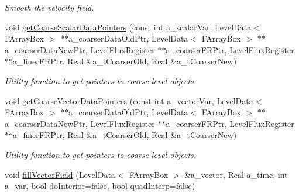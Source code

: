 \begin{DoxyCompactItemize}
\begin{DoxyCompactList}\small\item\em Smooth the velocity field. \end{DoxyCompactList}\item 
\hypertarget{class_a_m_r_level_mushy_layer_a0e1a5d490de9799a0579aa3bcc35a021}{void \hyperlink{class_a_m_r_level_mushy_layer_a0e1a5d490de9799a0579aa3bcc35a021}{get\-Coarse\-Scalar\-Data\-Pointers} (const int a\-\_\-scalar\-Var, Level\-Data$<$ F\-Array\-Box $>$ $\ast$$\ast$a\-\_\-coarser\-Data\-Old\-Ptr, Level\-Data$<$ F\-Array\-Box $>$ $\ast$$\ast$a\-\_\-coarser\-Data\-New\-Ptr, Level\-Flux\-Register $\ast$$\ast$a\-\_\-coarser\-F\-R\-Ptr, Level\-Flux\-Register $\ast$$\ast$a\-\_\-finer\-F\-R\-Ptr, Real \&a\-\_\-t\-Coarser\-Old, Real \&a\-\_\-t\-Coarser\-New)}\label{class_a_m_r_level_mushy_layer_a0e1a5d490de9799a0579aa3bcc35a021}

\begin{DoxyCompactList}\small\item\em Utility function to get pointers to coarse level objects. \end{DoxyCompactList}\item 
\hypertarget{class_a_m_r_level_mushy_layer_abc19ce85374efbff3c5c05d8bd71b330}{void \hyperlink{class_a_m_r_level_mushy_layer_abc19ce85374efbff3c5c05d8bd71b330}{get\-Coarse\-Vector\-Data\-Pointers} (const int a\-\_\-vector\-Var, Level\-Data$<$ F\-Array\-Box $>$ $\ast$$\ast$a\-\_\-coarser\-Data\-Old\-Ptr, Level\-Data$<$ F\-Array\-Box $>$ $\ast$$\ast$a\-\_\-coarser\-Data\-New\-Ptr, Level\-Flux\-Register $\ast$$\ast$a\-\_\-coarser\-F\-R\-Ptr, Level\-Flux\-Register $\ast$$\ast$a\-\_\-finer\-F\-R\-Ptr, Real \&a\-\_\-t\-Coarser\-Old, Real \&a\-\_\-t\-Coarser\-New)}\label{class_a_m_r_level_mushy_layer_abc19ce85374efbff3c5c05d8bd71b330}

\begin{DoxyCompactList}\small\item\em Utility function to get pointers to coarse level objects. \end{DoxyCompactList}\item 
\hypertarget{class_a_m_r_level_mushy_layer_af9d9ba5a4bed0091b9e5ecd4d84cd12d}{void \hyperlink{class_a_m_r_level_mushy_layer_af9d9ba5a4bed0091b9e5ecd4d84cd12d}{fill\-Vector\-Field} (Level\-Data$<$ F\-Array\-Box $>$ \&a\-\_\-vector, Real a\-\_\-time, int a\-\_\-var, bool do\-Interior=false, bool quad\-Interp=false)}\label{class_a_m_r_level_mushy_layer_af9d9ba5a4bed0091b9e5ecd4d84cd12d}


\end{DoxyCompactItemize}
